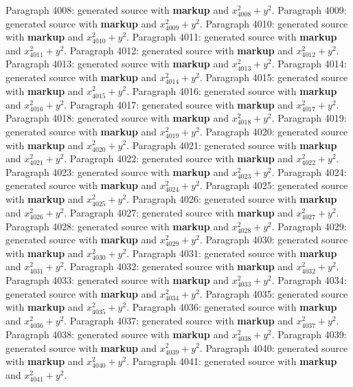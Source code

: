 \documentclass{article}
\begin{document}
Paragraph 4008: generated source with \textbf{markup} and $x_{4008}^2 + y^2$.
Paragraph 4009: generated source with \textbf{markup} and $x_{4009}^2 + y^2$.
Paragraph 4010: generated source with \textbf{markup} and $x_{4010}^2 + y^2$.
Paragraph 4011: generated source with \textbf{markup} and $x_{4011}^2 + y^2$.
Paragraph 4012: generated source with \textbf{markup} and $x_{4012}^2 + y^2$.
Paragraph 4013: generated source with \textbf{markup} and $x_{4013}^2 + y^2$.
Paragraph 4014: generated source with \textbf{markup} and $x_{4014}^2 + y^2$.
Paragraph 4015: generated source with \textbf{markup} and $x_{4015}^2 + y^2$.
Paragraph 4016: generated source with \textbf{markup} and $x_{4016}^2 + y^2$.
Paragraph 4017: generated source with \textbf{markup} and $x_{4017}^2 + y^2$.
Paragraph 4018: generated source with \textbf{markup} and $x_{4018}^2 + y^2$.
Paragraph 4019: generated source with \textbf{markup} and $x_{4019}^2 + y^2$.
Paragraph 4020: generated source with \textbf{markup} and $x_{4020}^2 + y^2$.
Paragraph 4021: generated source with \textbf{markup} and $x_{4021}^2 + y^2$.
Paragraph 4022: generated source with \textbf{markup} and $x_{4022}^2 + y^2$.
Paragraph 4023: generated source with \textbf{markup} and $x_{4023}^2 + y^2$.
Paragraph 4024: generated source with \textbf{markup} and $x_{4024}^2 + y^2$.
Paragraph 4025: generated source with \textbf{markup} and $x_{4025}^2 + y^2$.
Paragraph 4026: generated source with \textbf{markup} and $x_{4026}^2 + y^2$.
Paragraph 4027: generated source with \textbf{markup} and $x_{4027}^2 + y^2$.
Paragraph 4028: generated source with \textbf{markup} and $x_{4028}^2 + y^2$.
Paragraph 4029: generated source with \textbf{markup} and $x_{4029}^2 + y^2$.
Paragraph 4030: generated source with \textbf{markup} and $x_{4030}^2 + y^2$.
Paragraph 4031: generated source with \textbf{markup} and $x_{4031}^2 + y^2$.
Paragraph 4032: generated source with \textbf{markup} and $x_{4032}^2 + y^2$.
Paragraph 4033: generated source with \textbf{markup} and $x_{4033}^2 + y^2$.
Paragraph 4034: generated source with \textbf{markup} and $x_{4034}^2 + y^2$.
Paragraph 4035: generated source with \textbf{markup} and $x_{4035}^2 + y^2$.
Paragraph 4036: generated source with \textbf{markup} and $x_{4036}^2 + y^2$.
Paragraph 4037: generated source with \textbf{markup} and $x_{4037}^2 + y^2$.
Paragraph 4038: generated source with \textbf{markup} and $x_{4038}^2 + y^2$.
Paragraph 4039: generated source with \textbf{markup} and $x_{4039}^2 + y^2$.
Paragraph 4040: generated source with \textbf{markup} and $x_{4040}^2 + y^2$.
Paragraph 4041: generated source with \textbf{markup} and $x_{4041}^2 + y^2$.
\end{document}
